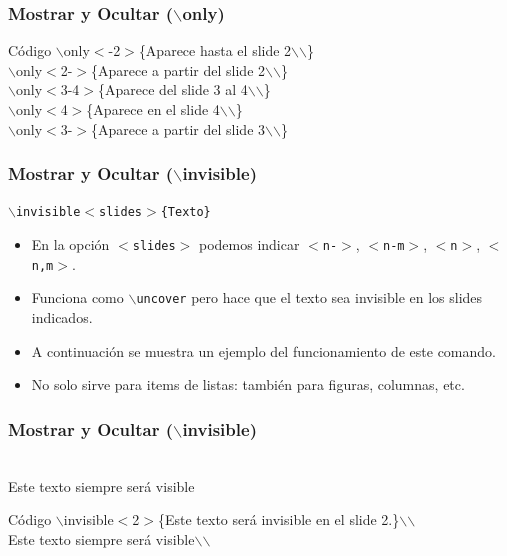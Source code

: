 \documentclass[aspectratio=1610]{beamer}%
\begin{document}
\begin{frame}[fragile]
\frametitle{\textbf{Mostrar y Ocultar ($\backslash$only)}}
\justifying
 
 
\begin{exampleblock}{Código}
$\backslash$only$<$-2$>$\{Aparece hasta el slide 2$\backslash$$\backslash$\} \\
$\backslash$only$<$2-$>$\{Aparece a partir del slide 2$\backslash$$\backslash$\}\\
$\backslash$only$<$3-4$>$\{Aparece del slide 3 al 4$\backslash$$\backslash$\}\\
$\backslash$only$<$4$>$\{Aparece en el slide 4$\backslash$$\backslash$\}\\
$\backslash$only$<$3-$>$\{Aparece a partir del slide 3$\backslash$$\backslash$\}\\
\end{exampleblock}

\end{frame}

\begin{frame}[fragile]
\frametitle{\textbf{Mostrar y Ocultar ($\backslash$invisible)}}
\justifying
   \texttt{$\backslash$invisible$<$slides$>$\{Texto\}}
 \begin{itemize}\justifying
  \item En la opción \texttt{$<$slides$>$} podemos indicar \texttt{$<$n-$>$}, \texttt{$<$n-m$>$}, \texttt{$<$n$>$}, \texttt{$<$n,m$>$}.
  \item Funciona como \texttt{$\backslash$uncover} pero hace que el texto sea invisible en los slides indicados. 
  \item A continuación se muestra un ejemplo del funcionamiento de este comando.
  \item No solo sirve para items de listas: también para figuras, columnas, etc.
\end{itemize}
\end{frame}

\begin{frame}[fragile]
\frametitle{\textbf{Mostrar y Ocultar ($\backslash$invisible)}}
\justifying
 
 \\ Este texto siempre será visible\\
 
 \begin{exampleblock}{Código}
 $\backslash$invisible$<$2$>$\{Este texto será invisible en el slide 2.\}$\backslash$$\backslash$\\
 Este texto siempre será visible$\backslash$$\backslash$
\end{exampleblock}

 
\end{frame}
\end{document}
